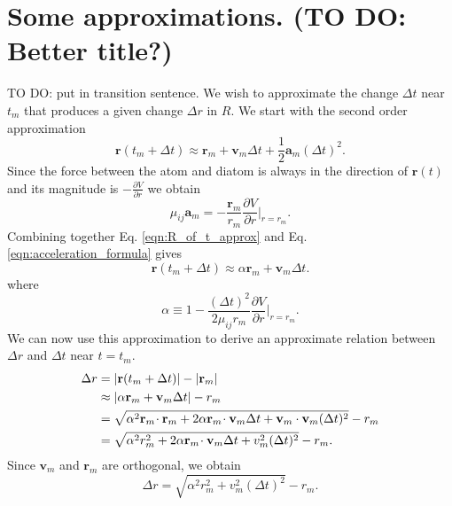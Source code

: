 \documentclass[article]{revtex4-2}
\begin{document}
\section{Some approximations. (TO DO: Better title?)}

{\color{red} TO DO: put in transition sentence.} We wish to approximate the change $\Delta t$ near $t_m$ that produces a given change $\Delta r$ in $R$. We start with the second order approximation
\begin{equation}
    \mathbf{r}(t_m + \Delta t) \approx \mathbf{r}_m + \mathbf{v}_m \Delta t + \frac{1}{2}\mathbf{a}_m (\Delta t)^2.
    \label{eqn:R_of_t_approx}
\end{equation}
Since the force between the atom and diatom is always in the direction of $\mathbf{r}(t)$ and its magnitude is $-\frac{\partial V}{\partial r}$ we obtain
\begin{equation}
    \mu_{ij} \mathbf{a}_m = - \frac{\mathbf{r}_m}{r_m}\frac{\partial V}{\partial r}\bigg|_{r=r_m}.
    \label{eqn:acceleration_formula}
\end{equation}
Combining together Eq. \ref{eqn:R_of_t_approx} and Eq. \ref{eqn:acceleration_formula} gives
\begin{equation}
    \mathbf{r}(t_m + \Delta t) \approx \alpha \mathbf{r}_m + \mathbf{v}_m \Delta t.
\end{equation}
where
\begin{equation}
    \alpha \equiv 1 - \frac{(\Delta t)^2}{2\mu_{ij} r_m}\frac{\partial V}{\partial r}\bigg|_{r=r_m}.
\end{equation}
We can now use this approximation to derive an approximate relation between $\Delta r$ and $\Delta t$ near $t=t_m$.
\begin{align*}
    \Delta r & = |\mathbf{r}(t_m + \Delta t)| - |\mathbf{r}_m| \\
        & \approx |\alpha \mathbf{r}_m + \mathbf{v}_m \Delta t| - r_m \\
        &= \sqrt{\alpha^2 \mathbf{r}_m \mkern-3mu\cdot \mathbf{r}_m + 2\alpha \mathbf{r}_m\mkern-3mu\cdot \mathbf{v}_m \Delta t + \mathbf{v}_m \cdot \mathbf{v}_m (\Delta t)^2}-r_m \\
        &= \sqrt{\alpha^2 r_m^2 + 2 \alpha \mathbf{r}_m\mkern-3mu\cdot \mathbf{v}_m \Delta t + v_m^2 (\Delta t)^2} - r_m.
\end{align*}
Since $\mathbf{v}_m$ and $\mathbf{r}_m$ are orthogonal, we obtain
\begin{equation}
    \Delta r = \sqrt{\alpha^2 r_m^2 + v_m^2 (\Delta t)^2} - r_m.
\end{equation}
\end{document}
